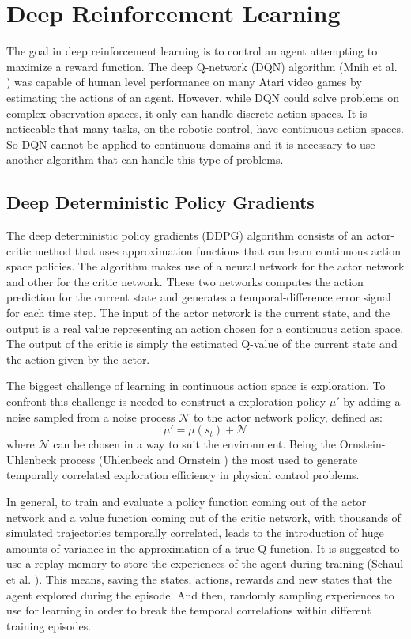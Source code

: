 \section*{Deep Reinforcement Learning}

The goal in deep reinforcement learning is to control an agent attempting to maximize a reward function. 
The deep Q-network (DQN) algorithm (Mnih et al. \citeyear{mnih2013playing}) was capable of human level performance on many Atari video games by estimating the actions of an agent.
However, while DQN could solve problems on complex observation spaces, it only can handle discrete action spaces. 
It is noticeable that many tasks, on the robotic control, have continuous action spaces. 
So DQN cannot be applied to continuous domains and it is necessary to use another algorithm that can handle this type of problems.

\subsection*{Deep Deterministic Policy Gradients}

The deep deterministic policy gradients (DDPG) algorithm consists of an actor-critic method that uses approximation functions that can learn continuous action space policies. The algorithm makes use of a neural network for the actor network and other for the critic network. These two networks computes the action prediction  for the current state and generates a temporal-difference error signal for each time step. The input of the actor network is the current state, and the output is a real value representing an action chosen for a continuous action space. The output of the critic is simply the estimated Q-value of the current state and the action given by the actor.

The biggest challenge of learning in continuous action space is exploration.
To confront this challenge is needed to construct a exploration policy $\mu'$ by adding a noise sampled from a noise process $\mathcal{N}$ to the actor network policy, defined as:
\begin{equation}
\mu' = \mu(s_t) + \mathcal{N}
\end{equation}
where $\mathcal{N}$ can be chosen in a way to suit the environment.
Being the Ornstein-Uhlenbeck process (Uhlenbeck and Ornstein \citeyear{uhlenbeck1930theory}) the most used to generate temporally correlated exploration efficiency in physical control problems.

In general, to train and evaluate a policy function coming out of the actor network and a value function coming out of the critic network, with thousands of simulated trajectories temporally correlated, leads to the introduction of huge amounts of variance in the approximation of a true Q-function.
It is suggested to use a replay memory to store the experiences of the agent during training (Schaul et al. \citeyear{schaul2015prioritized}).
This means, saving the states, actions, rewards and new states that the agent explored during the episode.
And then, randomly sampling experiences to use  for learning in order to break the temporal correlations within different training episodes.

